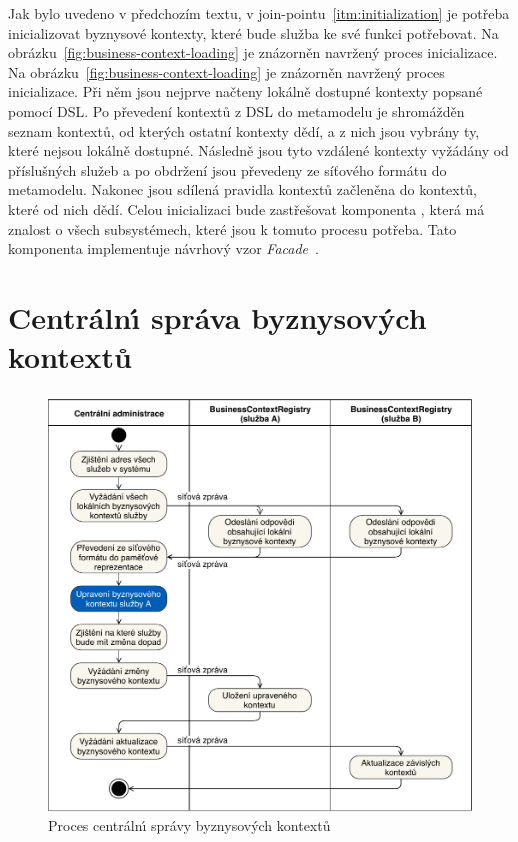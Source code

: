 Jak bylo uvedeno v předchozím textu, v join-pointu~\ref{itm:initialization} je potřeba inicializovat byznysové
kontexty, které bude služba ke své funkci potřebovat.
Na obrázku~\ref{fig:business-context-loading} je znázorněn navržený proces inicializace.
Na obrázku~\ref{fig:business-context-loading} je znázorněn navržený proces inicializace.
Při něm jsou nejprve načteny lokálně dostupné kontexty popsané pomocí \gls{DSL}.
Po převedení kontextů z \gls{DSL} do metamodelu je shromážděn seznam kontextů, od kterých ostatní kontexty dědí,
a z nich jsou vybrány ty, které nejsou lokálně dostupné. Následně jsou tyto vzdálené kontexty vyžádány od příslušných služeb
a po obdržení jsou převedeny ze síťového formátu do metamodelu. Nakonec jsou sdílená pravidla kontextů začleněna
do kontextů, které od nich dědí. Celou inicializaci bude zastřešovat komponenta , která
má znalost o všech subsystémech, které jsou k tomuto procesu potřeba. Tato komponenta implementuje
návrhový vzor \textit{Facade}~\cite{fowler2002patterns}.

\section{Centráln\'{\i} správa byznysových kontextů}\label{sec:central-administration-design}

\begin{figure}
    \centering
    \includegraphics[keepaspectratio=true, width=0.8\linewidth]{figures/business-context-management.pdf}
    \caption{Proces centráln\'{\i} správy byznysov\'ych kontextů}
    \label{fig:business-context-management}
\end{figure}

